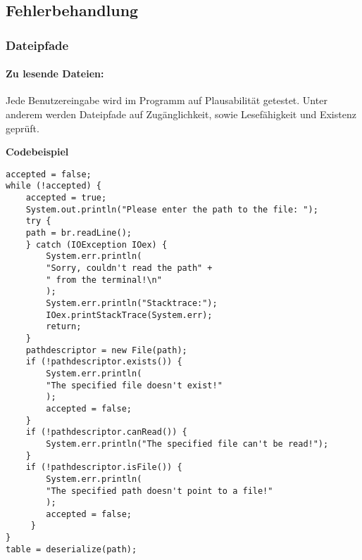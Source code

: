 \documentclass[11pt]{article}
\begin{document}
  \subsection{Fehlerbehandlung}
  \subsubsection{Dateipfade}
  \paragraph{Zu lesende Dateien:} 
  Jede Benutzereingabe wird im Programm auf Plausabilität getestet. 
  Unter anderem werden Dateipfade auf Zugänglichkeit, sowie Lesefähigkeit und Existenz geprüft.\\
\begin{samepage}
  \textbf{Codebeispiel}
\begin{lstlisting}[caption=Überprüfung eines Eingabedateipfads, label=lst:InputPathValidation]
accepted = false;
while (!accepted) {
	accepted = true;
    System.out.println("Please enter the path to the file: ");
    try {
    path = br.readLine();
    } catch (IOException IOex) {
    	System.err.println(
    	"Sorry, couldn't read the path" + 
    	" from the terminal!\n"
    	);
    	System.err.println("Stacktrace:");
    	IOex.printStackTrace(System.err);
    	return;
    }
    pathdescriptor = new File(path);
    if (!pathdescriptor.exists()) {
    	System.err.println(
    	"The specified file doesn't exist!"
    	);
    	accepted = false;
    }
    if (!pathdescriptor.canRead()) {
		System.err.println("The specified file can't be read!");
    }
    if (!pathdescriptor.isFile()) {
    	System.err.println(
    	"The specified path doesn't point to a file!"
    	);
     	accepted = false;
     }
}
table = deserialize(path);
\end{lstlisting}
\end{samepage}
\pagebreak
\end{document}
